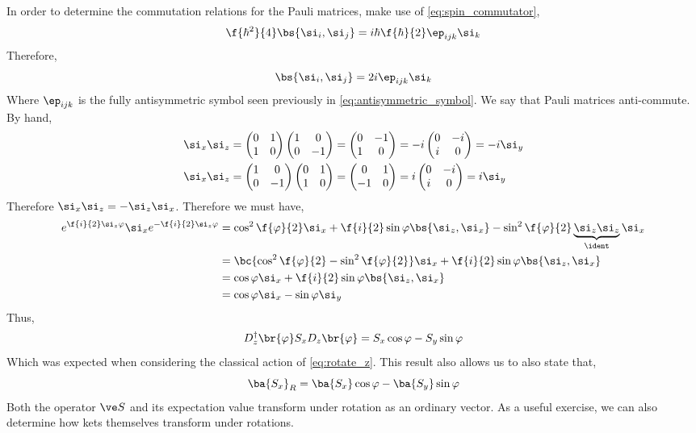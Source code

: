 \documentclass{article}
\begin{document}
In order to determine the commutation relations for the Pauli matrices, make use of \cref{eq:spin_commutator},
\[ \f{\hbar^2}{4}\bs{\si_i, \si_j} = i \hbar \f{\hbar}{2} \ep_{ijk} \si_k \]
Therefore,
\[ \bs{\si_i, \si_j} = 2i\ep_{ijk} \si_k \]
Where $\ep_{ijk}$ is the fully antisymmetric symbol seen previously in \cref{eq:antisymmetric_symbol}. We say that Pauli matrices anti-commute. By hand,
\begin{align*}
\si_x \si_z &= \begin{pmatrix}0 & 1 \\ 1 & 0 \end{pmatrix}\begin{pmatrix}1 & 0 \\ 0 & -1 \end{pmatrix} = \begin{pmatrix}0 & -1 \\ 1 & 0 \end{pmatrix} = -i\begin{pmatrix}0 & -i \\ i & 0 \end{pmatrix} = -i \si_y \\
\si_x \si_z &= \begin{pmatrix}1 & 0 \\ 0 & -1 \end{pmatrix}\begin{pmatrix}0 & 1 \\ 1 & 0 \end{pmatrix} = \begin{pmatrix}0 & 1 \\ -1 & 0 \end{pmatrix} = i\begin{pmatrix}0 & -i \\ i & 0 \end{pmatrix} = i \si_y
\end{align*}
Therefore $\si_x \si_z = - \si_z \si_x$. Therefore we must have,
\begin{align*}
    e^{\f{i}{2} \si_z \varphi } \si_x e^{-\f{i}{2} \si_z \varphi }
    &= \cos^2 \f{\varphi}{2} \si_x + \f{i}{2} \sin \varphi \bs{\si_z, \si_x}- \sin^2 \f{\varphi}{2} \underbrace{\si_z \si_z}_{\ident} \si_x  \\
    &= \bc{\cos^2 \f{\varphi}{2} - \sin^2 \f{\varphi}{2}} \si_x + \f{i}{2} \sin \varphi \bs{\si_z, \si_x} \\
    &= \cos \varphi \si_x + \f{i}{2} \sin \varphi \bs{\si_z, \si_x} \\
    &= \cos \varphi \si_x - \sin \varphi \si_y
\end{align*}
Thus,
\[ D^{\dagger}_z\br{\varphi} S_x D_z\br{\varphi} = S_x \cos \varphi - S_y \sin \varphi \]
Which was expected when considering the classical action of \cref{eq:rotate_z}. This result also allows us to also state that,
\[ \ba{S_x}_R = \ba{S_x} \cos \varphi - \ba{S_y} \sin \varphi \]
Both the operator $\ve S$ and its expectation value transform under rotation as an ordinary vector. As a useful exercise, we can also determine how kets themselves transform under rotations.
\end{document}
